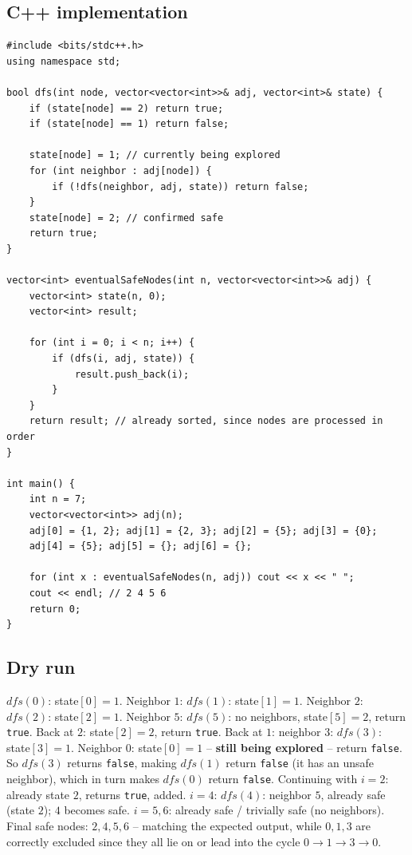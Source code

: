 \subsection*{C++ implementation}

\begin{lstlisting}
#include <bits/stdc++.h>
using namespace std;

bool dfs(int node, vector<vector<int>>& adj, vector<int>& state) {
    if (state[node] == 2) return true;
    if (state[node] == 1) return false;

    state[node] = 1; // currently being explored
    for (int neighbor : adj[node]) {
        if (!dfs(neighbor, adj, state)) return false;
    }
    state[node] = 2; // confirmed safe
    return true;
}

vector<int> eventualSafeNodes(int n, vector<vector<int>>& adj) {
    vector<int> state(n, 0);
    vector<int> result;

    for (int i = 0; i < n; i++) {
        if (dfs(i, adj, state)) {
            result.push_back(i);
        }
    }
    return result; // already sorted, since nodes are processed in order
}

int main() {
    int n = 7;
    vector<vector<int>> adj(n);
    adj[0] = {1, 2}; adj[1] = {2, 3}; adj[2] = {5}; adj[3] = {0};
    adj[4] = {5}; adj[5] = {}; adj[6] = {};

    for (int x : eventualSafeNodes(n, adj)) cout << x << " ";
    cout << endl; // 2 4 5 6
    return 0;
}
\end{lstlisting}

\subsection*{Dry run}


$\textit{dfs}(0)$: state$[0]=1$. Neighbor $1$: $\textit{dfs}(1)$:
state$[1]=1$. Neighbor $2$: $\textit{dfs}(2)$: state$[2]=1$. Neighbor
$5$: $\textit{dfs}(5)$: no neighbors, state$[5]=2$, return
\texttt{true}. Back at $2$: state$[2]=2$, return \texttt{true}. Back
at $1$: neighbor $3$: $\textit{dfs}(3)$: state$[3]=1$. Neighbor $0$:
state$[0]=1$ -- \textbf{still being explored} -- return
\texttt{false}. So $\textit{dfs}(3)$ returns \texttt{false}, making
$\textit{dfs}(1)$ return \texttt{false} (it has an unsafe neighbor),
which in turn makes $\textit{dfs}(0)$ return \texttt{false}. Continuing
with $i=2$: already state $2$, returns \texttt{true}, added. $i=4$:
$\textit{dfs}(4)$: neighbor $5$, already safe (state $2$); $4$ becomes
safe. $i=5,6$: already safe / trivially safe (no neighbors). Final
safe nodes: $2,4,5,6$ -- matching the expected output, while $0,1,3$
are correctly excluded since they all lie on or lead into the cycle
$0\to1\to3\to0$.

